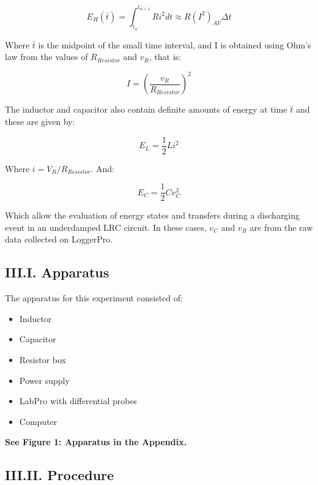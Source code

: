 \documentclass[twocolumn, letterpaper, 10pt, twoside]{article}
\begin{document}
 \begin{equation}
E_H(\bar{t}) = \int_{t_n}^{t_{n+1}}Ri^2dt \approx R(I^2)_{AV}\Delta t
\end{equation}

Where $\bar{t}$ is the midpoint of the small time interval, and I is obtained using Ohm's law from the values of $R_{Resistor}$ and $v_R$, that is: 

 \begin{equation}
I = (\frac{v_R}{R_{Resistor}})^2
\end{equation}

The inductor and capacitor also contain definite amounts of energy at time $\bar{t}$ and these are given by: 

 \begin{equation}
E_L = \frac{1}{2}Li^2 
\end{equation}

Where $i = V_R / R_{Resistor}$. And:

 \begin{equation}
E_C = \frac{1}{2}Cv_C^2 
\end{equation} 

Which allow the evaluation of energy states and transfers during a discharging event in an underdamped LRC circuit. In these cases, $v_C$ and $v_R$ are from the raw data collected on LoggerPro. 


 \subsection*{III.I. Apparatus}
    The apparatus for this experiment consisted of:
    \begin{itemize}
    	\item Inductor 
    	\item Capacitor 
    	\item Resistor box
    	\item Power supply 
    	\item LabPro with differential probes 
    	\item Computer 
        \end{itemize}
    
   {\centering\textbf{See Figure 1: Apparatus in the Appendix.}}\par
   
   \subsection*{III.II. Procedure}
   
\end{document}
